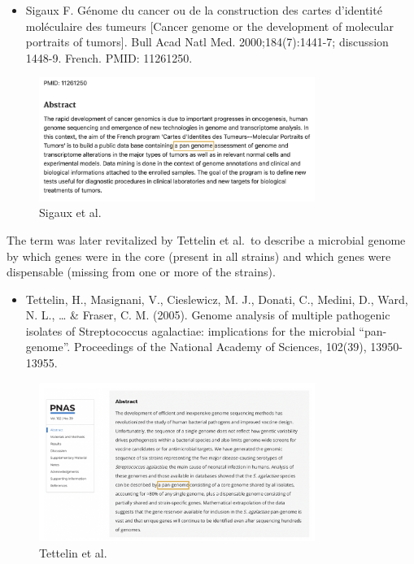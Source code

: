 \documentclass[
]{book}
\providecommand{\tightlist}{%
  \setlength{\itemsep}{0pt}\setlength{\parskip}{0pt}}
\begin{document}
\begin{itemize}
\tightlist
\item
  Sigaux F. Génome du cancer ou de la construction des cartes d'identité moléculaire des tumeurs {[}Cancer genome or the development of molecular portraits of tumors{]}. Bull Acad Natl Med. 2000;184(7):1441-7; discussion 1448-9. French. PMID: 11261250.
\end{itemize}

\begin{figure}
\centering
\includegraphics[width=0.8\textwidth,height=\textheight]{./Figures/Abstract1.png}
\caption{Sigaux et al.}
\end{figure}

The term was later revitalized by Tettelin et al.~to describe a microbial genome by which genes were in the core (present in all strains) and which genes were dispensable (missing from one or more of the strains).

\begin{itemize}
\tightlist
\item
  Tettelin, H., Masignani, V., Cieslewicz, M. J., Donati, C., Medini, D., Ward, N. L., \ldots{} \& Fraser, C. M. (2005). Genome analysis of multiple pathogenic isolates of Streptococcus agalactiae: implications for the microbial ``pan-genome''. Proceedings of the National Academy of Sciences, 102(39), 13950-13955.
\end{itemize}

\begin{figure}
\centering
\includegraphics[width=0.8\textwidth,height=\textheight]{./Figures/Abstract2.png}
\caption{Tettelin et al.}
\end{figure}
\end{document}

